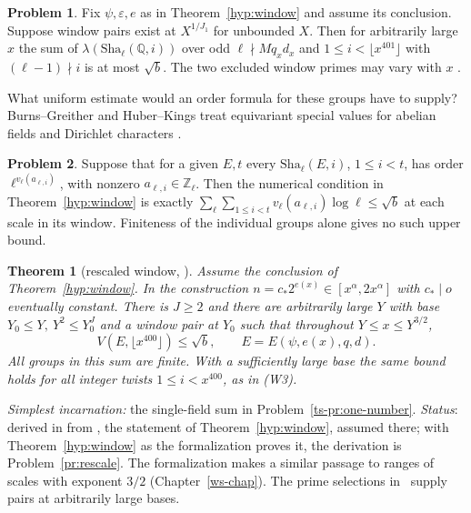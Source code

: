 \documentclass[reqno]{amsart}
\newcounter{chap}
\theoremstyle{definition}
\newtheorem{problem}{Problem}[section]
\theoremstyle{plain}
\newtheorem{theorem}{Theorem}[section]
\newcommand{\Z}{\mathbb Z}
\newcommand{\Q}{\mathbb Q}
\newcommand{\Sha}{\mathrm{Sha}}
\begin{document}
\begin{problem}\label{pr:window-consequence}
Fix \(\psi,\varepsilon,e\) as in Theorem~\ref{hyp:window} and assume its conclusion.  Suppose window pairs exist at \(X^{1/J_1}\) for unbounded \(X\).  Then for arbitrarily large \(x\) the sum of \(\lambda(\Sha_\ell(\Q,i))\) over odd \(\ell\nmid M q_xd_x\) and \(1\le i<\lfloor x^{401}\rfloor\) with \((\ell-1)\nmid i\) is at most \(\sqrt b\).  The two excluded window primes may vary with \(x\) \cite[Prop.~17.22]{Adr}.
\end{problem}

What uniform estimate would an order formula for these groups have to supply?  Burns--Greither and Huber--Kings treat equivariant special values for abelian fields and Dirichlet characters \cite{BuG,HK}.

\begin{problem}\label{pr:order-formula}
Suppose that for a given \(E,t\) every \(\Sha_\ell(E,i)\), \(1\le i<t\), has order \(\ell^{v_\ell(a_{\ell,i})}\), with nonzero \(a_{\ell,i}\in\Z_\ell\).  Then the numerical condition in Theorem~\ref{hyp:window} is exactly
\(\sum_{\ell}\sum_{1\le i<t}v_\ell(a_{\ell,i})\log\ell\le\sqrt b\)
at each scale in its window.  Finiteness of the individual groups alone gives no such upper bound.
\end{problem}

\begin{theorem}[rescaled window, {\cite[Props.~18.3--18.4]{Adr}}]\label{thm:W3}
Assume the conclusion of Theorem~\ref{hyp:window}.  In the construction \(n=c_*2^{e(x)}\in[x^\alpha,2x^\alpha]\) with \(c_*\mid o\) eventually constant.  There is \(J\ge2\) and there are arbitrarily large \(Y\) with base \(Y_0\le Y,\ Y^2\le Y_0^J\) and a window pair at \(Y_0\) such that throughout \(Y\le x\le Y^{3/2}\),
\[
 V(E,\lfloor x^{400}\rfloor)\le\sqrt b,\qquad E=E(\psi,e(x),q,d).
\]
All groups in this sum are finite.  With a sufficiently large base the same bound holds for all integer twists \(1\le i<x^{400}\), as in (W3).
\end{theorem}
\noindent\emph{Simplest incarnation:} the single-field sum in Problem~\ref{ts-pr:one-number}. \emph{Status}: derived in \cite[Props.~18.3--18.4]{Adr} from \cite[Hyp.~17.11]{Adr}, the statement of Theorem~\ref{hyp:window}, assumed there; with Theorem~\ref{hyp:window} as the formalization proves it, the derivation is Problem~\ref{pr:rescale}.  The formalization makes a similar passage to ranges of scales with exponent \(3/2\) (Chapter~\ref{ws-chap}).  The prime selections in~\cite[Thms.~5.10, 5.12, Prop.~18.4]{Adr} supply pairs at arbitrarily large bases.
\end{document}
